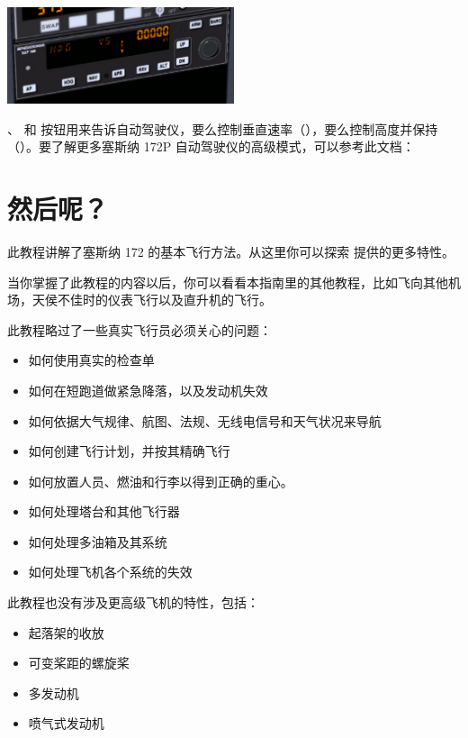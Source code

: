 \begin{center}
\includegraphics[width=0.5\textwidth]{img/tut_51}
\end{center}

、 和  按钮用来告诉自动驾驶仪，要么控制垂直速率（\textcolor{orange}{}），要么控制高度并保持（\textcolor{orange}{}）。要了解更多塞斯纳 172P 自动驾驶仪的高级模式，可以参考此文档：

\section{然后呢？}
\label{sec:Poslowie}

此教程讲解了塞斯纳 172 的基本飞行方法。从这里你可以探索 \FlightGear{} 提供的更多特性。

当你掌握了此教程的内容以后，你可以看看本指南里的其他教程，比如飞向其他机场，天侯不佳时的仪表飞行以及直升机的飞行。

此教程略过了一些真实飞行员必须关心的问题：

\begin{itemize}
    \item 如何使用真实的检查单
    \item 如何在短跑道做紧急降落，以及发动机失效
    \item 如何依据大气规律、航图、法规、无线电信号和天气状况来导航
    \item 如何创建飞行计划，并按其精确飞行
    \item 如何放置人员、燃油和行李以得到正确的重心。
    \item 如何处理塔台和其他飞行器
    \item 如何处理多油箱及其系统
    \item 如何处理飞机各个系统的失效
\end{itemize}

此教程也没有涉及更高级飞机的特性，包括：

\begin{itemize}
  \item 起落架的收放
  \item 可变桨距的螺旋桨
  \item 多发动机
  \item 喷气式发动机
\end{itemize}

